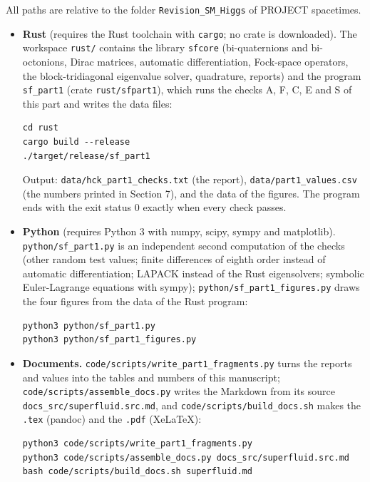 \documentclass[
  10pt,
]{article}
\begin{document}
All paths are relative to the folder \texttt{Revision\_SM\_Higgs} of
PROJECT spacetimes.

\begin{itemize}
\item
  \textbf{Rust} (requires the Rust toolchain with \texttt{cargo}; no
  crate is downloaded). The workspace \texttt{rust/} contains the
  library \texttt{sfcore} (bi-quaternions and bi-octonions, Dirac
  matrices, automatic differentiation, Fock-space operators, the
  block-tridiagonal eigenvalue solver, quadrature, reports) and the
  program \texttt{sf\_part1} (crate \texttt{rust/sfpart1}), which runs
  the checks A, F, C, E and S of this part and writes the data files:

\begin{verbatim}
cd rust
cargo build --release
./target/release/sf_part1
\end{verbatim}

  Output: \texttt{data/hck\_part1\_checks.txt} (the report),
  \texttt{data/part1\_values.csv} (the numbers printed in Section 7),
  and the data of the figures. The program ends with the exit status 0
  exactly when every check passes.
\item
  \textbf{Python} (requires Python 3 with numpy, scipy, sympy and
  matplotlib). \texttt{python/sf\_part1.py} is an independent second
  computation of the checks (other random test values; finite
  differences of eighth order instead of automatic differentiation;
  LAPACK instead of the Rust eigensolvers; symbolic Euler-Lagrange
  equations with sympy); \texttt{python/sf\_part1\_figures.py} draws the
  four figures from the data of the Rust program:

\begin{verbatim}
python3 python/sf_part1.py
python3 python/sf_part1_figures.py
\end{verbatim}
\item
  \textbf{Documents.} \texttt{code/scripts/write\_part1\_fragments.py}
  turns the reports and values into the tables and numbers of this
  manuscript; \texttt{code/scripts/assemble\_docs.py} writes the
  Markdown from its source \texttt{docs\_src/superfluid.src.md}, and
  \texttt{code/scripts/build\_docs.sh} makes the \texttt{.tex} (pandoc)
  and the \texttt{.pdf} (XeLaTeX):

\begin{verbatim}
python3 code/scripts/write_part1_fragments.py
python3 code/scripts/assemble_docs.py docs_src/superfluid.src.md
bash code/scripts/build_docs.sh superfluid.md
\end{verbatim}
\end{itemize}
\end{document}
